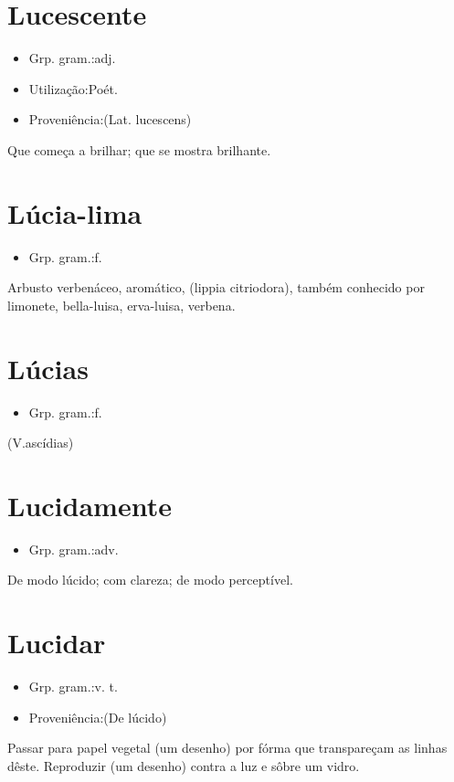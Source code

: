 \section{Lucescente}
\begin{itemize}
\item {Grp. gram.:adj.}
\end{itemize}
\begin{itemize}
\item {Utilização:Poét.}
\end{itemize}
\begin{itemize}
\item {Proveniência:(Lat. \textunderscore lucescens\textunderscore )}
\end{itemize}
Que começa a brilhar; que se mostra brilhante.
\section{Lúcia-lima}
\begin{itemize}
\item {Grp. gram.:f.}
\end{itemize}
Arbusto verbenáceo, aromático, (\textunderscore lippia citriodora\textunderscore ), também conhecido por \textunderscore limonete\textunderscore , \textunderscore bella-luisa\textunderscore , \textunderscore erva-luisa\textunderscore , \textunderscore verbena\textunderscore .
\section{Lúcias}
\begin{itemize}
\item {Grp. gram.:f.}
\end{itemize}
(V.ascídias)
\section{Lucidamente}
\begin{itemize}
\item {Grp. gram.:adv.}
\end{itemize}
De modo lúcido; com clareza; de modo perceptível.
\section{Lucidar}
\begin{itemize}
\item {Grp. gram.:v. t.}
\end{itemize}
\begin{itemize}
\item {Proveniência:(De \textunderscore lúcido\textunderscore )}
\end{itemize}
Passar para papel vegetal (um desenho) por fórma que transpareçam as linhas dêste.
Reproduzir (um desenho) contra a luz e sôbre um vidro.
